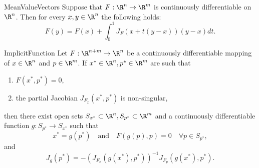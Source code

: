 
\begin{app}{MeanValueVectors}
    Suppose that $F: \R^n \to \R^m$ is continuously differentiable on $\R^n$. Then for every $x,y \in \R^n$ the following holds: 
    \begin{equation*}
        F(y) = F(x) + \int_0^1 J_F(x + t(y - x)) (y - x) dt.
    \end{equation*}
    \vspace{-0.3cm}
\end{app}

\begin{theo}{ImplicitFunction}
    Let $F: \R^{n+m} \rightarrow \R^n$ be a continuously differentiable mapping of $x \in \R^n$ and $p \in \R^m$. If $x^* \in \R^n, p^* \in \R^m$ are such that 
    \begin{enumerate}
        \item $F(x^*, p^*) = 0$,
        \item the partial Jacobian $J_{F_x}(x^*, p^*)$ is non-singular,
    \end{enumerate}
    then there exist open sets $S_{x^*} \subset \R^n, S_{p^*} \subset \R^m$ and a continuously differentiable function $g: S_{p^*} \rightarrow S_{x^*}$ such that 
    \begin{equation*}
        x^* = g(p^*) \quad \text{and} \quad F(g(p), p) = 0 \quad \forall p \in S_{p^*},
    \end{equation*}
    and 
    \begin{equation*}
        J_g(p^*) = -{(J_{F_x}(g(x^*), p^*))}^{-1} J_{F_p}(g(x^*), p^*).
    \end{equation*}
    \vspace*{-0.5cm}
\end{theo}